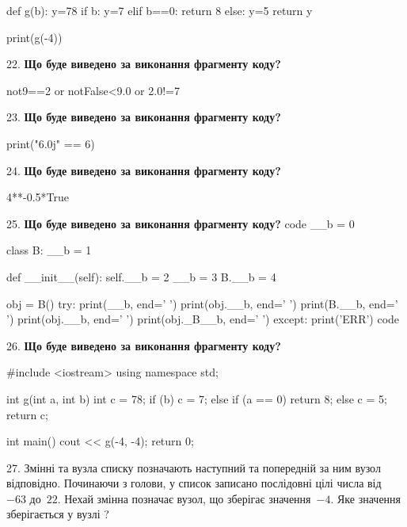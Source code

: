 \documentclass[11pt]{article}
\begin{document}
def g(b):
    y=78
    if b: 
        y=7
    elif b==0:
         return 8
    else:
         y=5
    return y

print(g(-4))
\par\vspace{5mm}

22. \textbf{Що буде виведено за виконання фрагменту коду?}

not9==2 or notFalse<9.0 or 2.0!=7
\par\vspace{5mm}

23. \textbf{Що буде виведено за виконання фрагменту коду?}

print("6.0j" == 6)
\par\vspace{5mm}

24. \textbf{Що буде виведено за виконання фрагменту коду?}

4**-0.5*True
\par\vspace{5mm}

25. \textbf{Що буде виведено за виконання фрагменту коду?}
code
__b = 0

class B:
    __b = 1
    
    def __init__(self):
        self.__b = 2
        __b = 3
        B.__b = 4

obj = B()
try:
    print(__b, end=' ')
    print(obj.__b, end=' ')
    print(B.__b, end=' ')
    print(obj.__b, end=' ')
    print(obj._B__b, end=' ')
except:
    print('ERR')
code
\par\vspace{5mm}

26. \textbf{Що буде виведено за виконання фрагменту коду?}

#include <iostream>
using namespace std;

int g(int a, int b){
    int c = 78;
    if (b)
        c = 7;
    else if (a == 0)
         return 8;
    else 
        c = 5;
    return c;
}

int main(){
    cout << g(-4, -4);
    return 0;
}
\par\vspace{5mm}

27. 
Змінні  та  вузла списку позначають наступний та попередній за ним вузол відповідно. Починаючи з голови, у список записано послідовні цілі числа від~$-63$ до~$22$. Нехай змінна  позначає вузол, що зберігає значення~$-4$.
Яке значення зберігається у вузлі  ?
\par\vspace{5mm}
\end{document}
